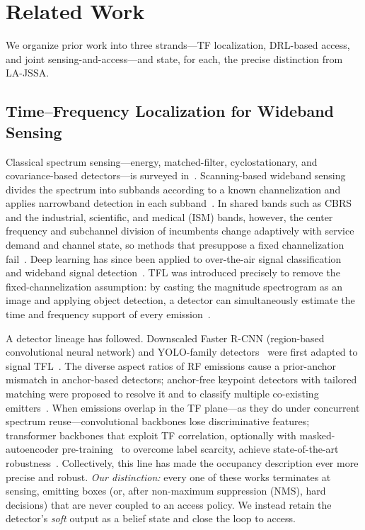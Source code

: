 \documentclass[journal]{IEEEtran}
\begin{document}
\section{Related Work}
\label{sec:related_work}

We organize prior work into three strands---TF localization, DRL-based
access, and joint sensing-and-access---and state, for each, the precise
distinction from LA-JSSA.

\subsection{Time--Frequency Localization for Wideband Sensing}
Classical spectrum sensing---energy, matched-filter, cyclostationary, and
covariance-based detectors---is surveyed
in~\cite{yucek2009survey,axell2012spectrum,arjoune2019comprehensive}.
Scanning-based wideband sensing divides the spectrum into subbands according
to a known channelization and applies narrowband detection in each
subband~\cite{wang2018}. In shared bands such as CBRS and the industrial,
scientific, and medical (ISM) bands, however, the
center frequency and subchannel division of incumbents change adaptively with
service demand and channel state, so methods that presuppose a fixed
channelization fail~\cite{sohul2015cbrs}. Deep learning has since been applied
to over-the-air signal classification~\cite{oshea2018over,oshea2021dataset}
and wideband signal detection~\cite{vo2020wideband}. TFL was introduced
precisely to remove the fixed-channelization assumption: by casting the
magnitude spectrogram as an image and applying object detection, a detector
can simultaneously estimate the time and frequency support of every
emission~\cite{prasad2020,prasad2021spectrum}.

A detector lineage has followed. Downscaled Faster R-CNN (region-based
convolutional neural network) and YOLO-family
detectors~\cite{redmon2018yolov3} were first adapted to signal TFL~\cite{prasad2020,li2022hf}. The
diverse aspect ratios of RF emissions cause a prior-anchor mismatch in
anchor-based detectors; anchor-free keypoint detectors with tailored matching
were proposed to resolve it and to classify multiple co-existing
emitters~\cite{zhao2024uav}. When emissions overlap in the TF plane---as they
do under concurrent spectrum reuse---convolutional backbones lose
discriminative features; transformer backbones that exploit TF correlation,
optionally with masked-autoencoder pre-training~\cite{he2022mae} to overcome label scarcity,
achieve state-of-the-art robustness~\cite{zhao2025trtfl_ssl,
zhang2024spectrumtransformer,he2022mae}. Collectively, this line has made the
occupancy description ever more precise and robust. \emph{Our distinction:}
every one of these works terminates at sensing, emitting boxes (or, after
non-maximum suppression (NMS), hard decisions) that are never coupled to an access
policy. We instead retain the detector's \emph{soft} output as a belief state
and close the loop to access.
\end{document}
